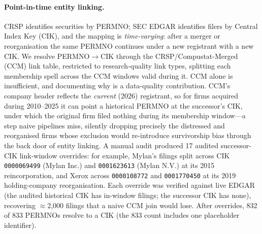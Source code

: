 \paragraph{Point-in-time entity linking.}
CRSP identifies securities by PERMNO; SEC EDGAR identifies filers by Central Index Key (CIK), and the mapping is \emph{time-varying}: after a merger or reorganisation the same PERMNO continues under a new registrant with a new CIK. We resolve PERMNO$\to$CIK through the CRSP/Compustat-Merged (CCM) link table, restricted to research-quality link types, splitting each membership spell across the CCM windows valid during it. CCM alone is insufficient, and documenting why is a data-quality contribution. CCM's company header reflects the \emph{current} (2026) registrant, so for firms acquired during 2010--2025 it can point a historical PERMNO at the successor's CIK, under which the original firm filed nothing during its membership window---a step naive pipelines miss, silently dropping precisely the distressed and reorganised firms whose exclusion would re-introduce survivorship bias through the back door of entity linking. A manual audit produced 17 audited successor-CIK link-window overrides: for example, Mylan's filings split across CIK \texttt{0000069499} (Mylan Inc.) and \texttt{0001623613} (Mylan N.V.) at its 2015 reincorporation, and Xerox across \texttt{0000108772} and \texttt{0001770450} at its 2019 holding-company reorganisation. Each override was verified against live EDGAR (the audited historical CIK has in-window filings; the successor CIK has none), recovering $\approx$2{,}000 filings that a naive CCM join would lose. After overrides, 832 of 833 PERMNOs resolve to a CIK (the 833 count includes one placeholder identifier).

